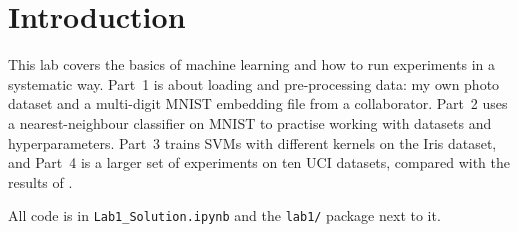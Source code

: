 \section{Introduction}

This lab covers the basics of machine learning and how to run experiments in a systematic way.
Part~1 is about loading and pre-processing data: my own photo dataset and a multi-digit MNIST
embedding file from a collaborator. Part~2 uses a nearest-neighbour classifier on MNIST to practise
working with datasets and hyperparameters. Part~3 trains SVMs with different kernels on the Iris
dataset, and Part~4 is a larger set of experiments on ten UCI datasets, compared with the results
of \textcite{delgado2014}.

All code is in \texttt{Lab1\_Solution.ipynb} and the \texttt{lab1/} package next to it.
